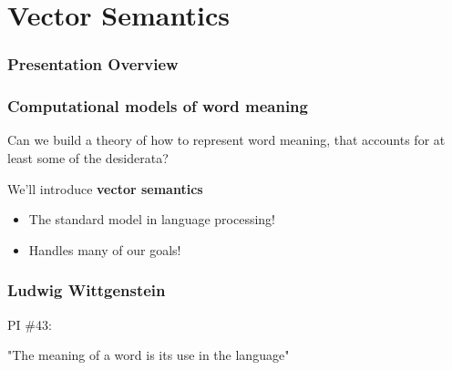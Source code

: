 \documentclass[13.5pt,aspecratio=169, xcolor=dvipsnames]{beamer}
\begin{document}
        \section{Vector Semantics}
        \begin{frame}
            \doublespacing
                \frametitle{Presentation Overview} %
                
                \tableofcontents[currentsection] %
        \end{frame}
    
    \begin{frame}
        \onehalfspacing
            \frametitle{Computational models of word meaning}
            {\Large
            Can we build a theory of how to represent word
meaning, that accounts for at least some of the
desiderata?
            \bigskip
            \begin{block}{We'll introduce \textbf{vector semantics}}
                \begin{itemize}
                    \item The standard model in language processing!
                    \item Handles many of our goals!
                \end{itemize}
            \end{block}
}
        \end{frame}

        \begin{frame}
            \onehalfspacing
                \frametitle{Ludwig Wittgenstein}
                {\Large
                PI \#43: \\
                
                \begin{minipage}{0.9\textwidth}
                    \begin{block}{}
                "The meaning of a word is its use in the language"
                    \end{block}
                \end{minipage}
                 }       
            \end{frame}
\end{document}
